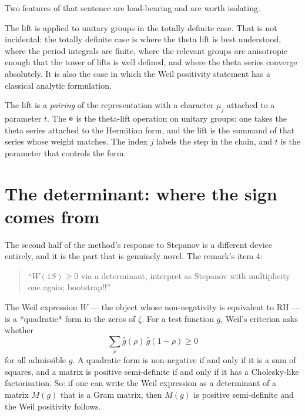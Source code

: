 Two features of that sentence are load-bearing and are worth isolating.

\begin{description}[style=nextline,leftmargin=0pt,labelwidth=0pt,labelsep=0pt,font=\sffamily\bfseries\small,
  itemsep=6pt]
\item[``Between totally definite unitary groups.'] The lift is applied to
unitary groups in the totally definite case. That is not incidental: the
totally definite case is where the theta lift is best understood, where the
period integrals are finite, where the relevant groups are anisotropic enough
that the tower of lifts is well defined, and where the theta series converge
absolutely. It is also the case in which the Weil positivity statement has a
classical analytic formulation.
\item[``$\pi \mapsto \pi \tboxplus \mu_j\lbrack t\rbrack$''.] The lift is a \emph{pairing} of
the representation with a character $\mu_j$ attached to a parameter $t$. The
$\tboxplus$ is the theta-lift operation on unitary groups: one takes the
theta series attached to the Hermitian form, and the lift is the summand of
that series whose weight matches. The index $j$ labels the step in the chain,
and $t$ is the parameter that controls the form.
\end{description}

\section{The determinant: where the sign comes from}The second half of the method's response to Stepanov is a different device
entirely, and it is the part that is genuinely novel. The remark's item 4:

\begin{quote}
\small
``$W(1S) \ge 0$ via a determinant, interpret as Stepanov with multiplicity one
again; bootstrap!!''
\end{quote}

The Weil expression $W$ --- the object whose non-negativity is equivalent to
RH --- is a *quadratic* form in the zeros of $\zeta$. For a test function $g$,
Weil's criterion asks whether
\begin{equation}
\sum_{\rho} \hat g(\rho)\,\hat g(1-\rho) \ge 0
\label{eq:weilquad}
\end{equation}
for all admissible $g$. A quadratic form is non-negative if and only if it is
a sum of squares, and a matrix is positive semi-definite if and only if it has
a Cholesky-like factorisation. So: if one can write the Weil expression as a
determinant of a matrix $M(g)$ that is a Gram matrix, then $M(g)$ is positive
semi-definite and the Weil positivity follows.

